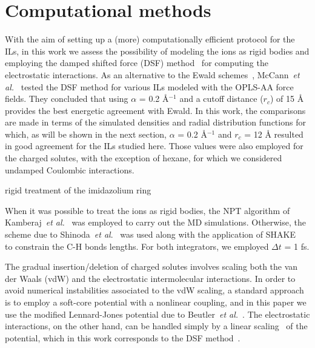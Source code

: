\documentclass[3p,twocolumn]{elsarticle}
\begin{document}
\section{Computational methods}
\label{sec:sim_details}

With the aim of setting up a (more) computationally efficient protocol for the ILs, in this work we assess the possibility of modeling the ions as rigid bodies and employing the damped shifted force (DSF) method~\cite{Fennell2006} for computing the electrostatic interactions. As an alternative to the Ewald schemes~\cite{Ewald_1921,Darden_1993,Hockney_1988}, McCann~\textit{et al.}~\cite{McCann_2013} tested the DSF method for various ILs modeled with the OPLS-AA force fields. They concluded that using $\alpha$ = 0.2 {\AA}$^{-1}$ and a cutoff distance ($r_c$) of 15 {\AA} provides the best energetic agreement with Ewald. In this work, the comparisons are made in terms of the simulated densities and radial distribution functions for which, as will be shown in the next section, $\alpha$ = 0.2 {\AA}$^{-1}$ and $r_c$ = 12 {\AA} resulted in good agreement for the ILs studied here. Those values were also employed for the charged solutes, with the exception of hexane, for which we considered undamped Coulombic interactions.

rigid treatment of the imidazolium ring~\cite{Kobrak_2004,Lynden_Bell_2006}
\cite{Rey_Castro_2007}

When it was possible to treat the ions as rigid bodies, the NPT algorithm of Kamberaj~\textit{et al.}~\cite{Kamberaj_2005} was employed to carry out the MD simulations. Otherwise, the scheme due to Shinoda~\textit{et al}.~\cite{Shinoda2004} was used along with the application of SHAKE~\cite{Ryckaert1977} to constrain the C-H bonds lengths. For both integrators, we employed $\Delta t$ = 1 fs.

The gradual insertion/deletion of charged solutes involves scaling both the van der Waals (vdW) and the electrostatic intermolecular interactions. In order to avoid numerical instabilities associated to the vdW scaling, a standard approach is to employ a soft-core potential with a nonlinear coupling, and in this paper we use the modified Lennard-Jones potential due to Beutler~\textit{et al.}~\cite{Beutler_1994}. The electrostatic interactions, on the other hand, can be handled simply by a linear scaling~\cite{Naden_2015} of the potential, which in this work corresponds to the DSF method~\cite{Fennell2006}.
\end{document}
